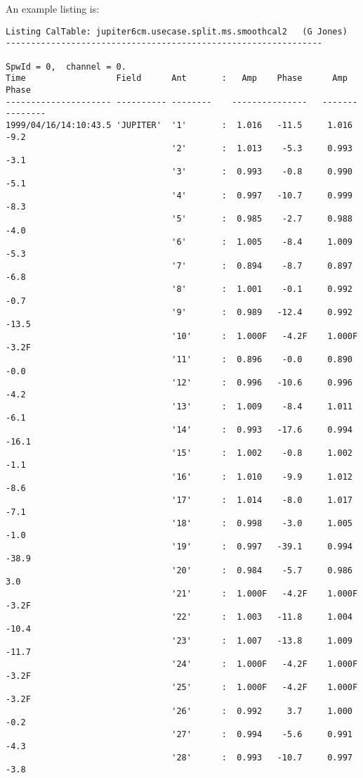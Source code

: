 An example listing is:
\small
\begin{verbatim}
Listing CalTable: jupiter6cm.usecase.split.ms.smoothcal2   (G Jones) 
---------------------------------------------------------------

SpwId = 0,  channel = 0.
Time                  Field      Ant       :   Amp    Phase      Amp    Phase    
--------------------- ---------- --------    ---------------   ---------------
1999/04/16/14:10:43.5 'JUPITER'  '1'       :  1.016   -11.5     1.016    -9.2    
                                 '2'       :  1.013    -5.3     0.993    -3.1    
                                 '3'       :  0.993    -0.8     0.990    -5.1    
                                 '4'       :  0.997   -10.7     0.999    -8.3    
                                 '5'       :  0.985    -2.7     0.988    -4.0    
                                 '6'       :  1.005    -8.4     1.009    -5.3    
                                 '7'       :  0.894    -8.7     0.897    -6.8    
                                 '8'       :  1.001    -0.1     0.992    -0.7    
                                 '9'       :  0.989   -12.4     0.992   -13.5    
                                 '10'      :  1.000F   -4.2F    1.000F   -3.2F   
                                 '11'      :  0.896    -0.0     0.890    -0.0    
                                 '12'      :  0.996   -10.6     0.996    -4.2    
                                 '13'      :  1.009    -8.4     1.011    -6.1    
                                 '14'      :  0.993   -17.6     0.994   -16.1    
                                 '15'      :  1.002    -0.8     1.002    -1.1    
                                 '16'      :  1.010    -9.9     1.012    -8.6    
                                 '17'      :  1.014    -8.0     1.017    -7.1    
                                 '18'      :  0.998    -3.0     1.005    -1.0    
                                 '19'      :  0.997   -39.1     0.994   -38.9    
                                 '20'      :  0.984    -5.7     0.986     3.0    
                                 '21'      :  1.000F   -4.2F    1.000F   -3.2F   
                                 '22'      :  1.003   -11.8     1.004   -10.4    
                                 '23'      :  1.007   -13.8     1.009   -11.7    
                                 '24'      :  1.000F   -4.2F    1.000F   -3.2F   
                                 '25'      :  1.000F   -4.2F    1.000F   -3.2F   
                                 '26'      :  0.992     3.7     1.000    -0.2    
                                 '27'      :  0.994    -5.6     0.991    -4.3    
                                 '28'      :  0.993   -10.7     0.997    -3.8    

\end{verbatim}
\normalsize

